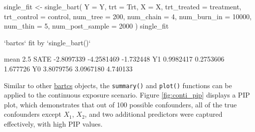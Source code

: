\begin{example}
single_fit <- single_bart(
    Y = Y, trt = Trt, X = X,
    trt_treated = treatment, trt_control = control,
    num_tree = 200, num_chain = 4,
    num_burn_in = 10000, num_thin = 5, num_post_sample = 2000
  )
single_fit

`bartcs` fit by `single_bart()`

           mean       2.5%
SATE -2.8097339 -4.2581469 -1.732448
Y1    0.9982417  0.2753606  1.677726
Y0    3.8079756  3.0967180  4.740133
\end{example}
Similar to other \href{https://CRAN.R-project.org/package=bartcs}{bartcs} objects, the \verb|summary()| and \verb|plot()| functions can be applied to the continuous exposure scenario. Figure \ref{fig:conti_pip} displays a PIP plot, which demonstrates that out of 100 possible confounders, all of the true confounders except $X_1$, $X_2$, and two additional predictors were captured effectively, with high PIP values.

